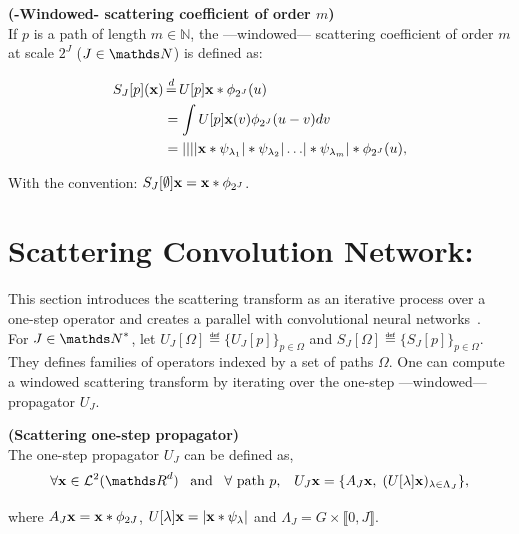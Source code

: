 \documentclass[a4paper,11pt]{report}
\begin{document}
      \begin{defn} \textbf{(-Windowed- scattering coefficient of order $m$)}\\
				If $p$ is a path of length $m \in \mathds{N}$, the ---windowed--- scattering coefficient of order $m$ at scale $2^{J}$ ($J \in \dsN$) is defined as:
				
				\begin{equation}
					\label{eq:ST windowed}
					\begin{split}
						S_{J}[p](\bfx) &\eqdef U[p]\bfx \ast \phi_{2^{J}}(u) \\
									&= \int U[p]\bfx(v) \phi_{2^{J}}(u-v) dv \\
									&= \abs{\abs{\abs{\abs{\bfx \ast \psi_{\lambda_{1}}} \ast \psi_{\lambda_{2}}} 
							\dots } \ast \psi_{\lambda_{m}}} \ast \phi_{2^{J}}(u),
					\end{split}
				\end{equation}
				
				With the convention: $S_{J}[\emptyset]{\bf x} = {\bf x} \ast \phi_{2^{J}}$.\\
      	\label{def:SC windozed}
      \end{defn}

		\section{Scattering Convolution Network:}
			\label{sec:ST/SCN}
			
			This section introduces the scattering transform as an iterative process over a one-step operator and creates a parallel with convolutional neural networks~\citep{lecun2010convolutional}.\\
			
			For $J \in \dsN^{\ast}$, let $U_{J}[\Omega] \eqdef \{U_{J}[p]\}_{p \in \Omega}$ and $S_{J}[\Omega] \eqdef \{S_{J}[p]\}_{p \in \Omega}$. They defines families of operators indexed by a set of paths $\Omega$. One can compute a windowed scattering transform by iterating over the one-step ---windowed--- propagator $U_{J}$.
			
			\begin{defn}  \textbf{(Scattering one-step propagator)}\\
				The one-step propagator $U_{J}$ can be defined as,
				\begin{equation}
					\forall \bfx \in \mcalL^{2}(\dsR^{d}) \;\;\; \text{and} \;\;\; \forall \text{ path } p, \;\;\;
					U_{J} \bfx = \{ A_{J}\bfx , \; (U[\lambda]\bfx)_{\lambda \in \Lambda_{J}} \},
					\label{eq:One step propagator}
				\end{equation}
				
				where $A_{J}{\bf x} = {\bf x} \ast \phi_{2J}$, $U[\lambda]{\bf x} = \left| {\bf x} \ast \psi_{\lambda} \right|$ and $\Lambda_{J} = G \times \llbracket0, J \rrbracket$.\\
				\label{def:One step propagator}
			\end{defn}
			
\end{document}
